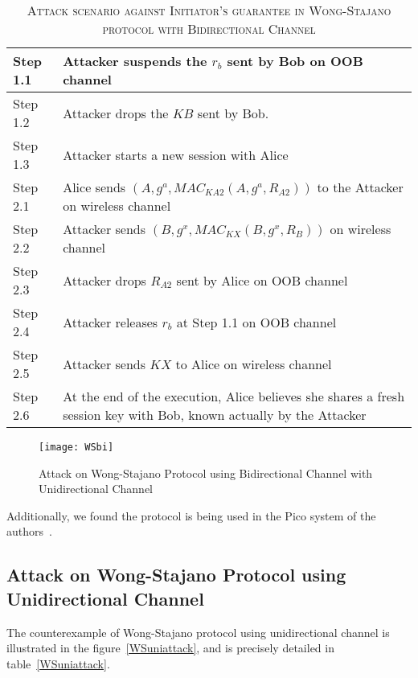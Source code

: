 \begin{table}[t]
\centering
\caption{\textsc{Attack scenario against Initiator's guarantee in Wong-Stajano protocol with Bidirectional Channel}}
\label{WSbiattacktable}
{\small
\begin{tabular}{| l | p{11cm} |}
 \hline
 Step 1.1 & Attacker suspends the $r_b$ sent by Bob on OOB channel\\ \hline
 Step 1.2 & Attacker drops the $KB$ sent by Bob. \\ \hline
 Step 1.3 & Attacker starts a new session with Alice\\ \hline \hline
 Step 2.1 & Alice sends $(A, g^{a}, MAC_{KA2}(A,g^{a},R_{A2}))$ to the Attacker on wireless channel\\ \hline
 Step 2.2 & Attacker sends $(B, g^{x}, MAC_{KX}(B,g^{x},R_{B}))$ on wireless channel\\ \hline
 Step 2.3 & Attacker drops $R_{A2}$ sent by Alice on OOB channel\\ \hline
 Step 2.4 & Attacker releases $r_b$ at Step 1.1 on OOB channel \\ \hline
 Step 2.5 & Attacker sends $KX$ to Alice on wireless channel\\ \hline
 Step 2.6 & At the end of the execution, Alice believes she shares a fresh session key with Bob, known actually by the Attacker\\ \hline
\end{tabular}
}
\end{table}

\begin{figure}
  \centering
  \texttt{[image: WSbi]}
  \caption{Attack on Wong-Stajano Protocol using Bidirectional Channel with Unidirectional Channel}
  \label{WSbiattack}
\end{figure}

Additionally, we found the protocol is being used in the Pico system of the authors~\cite{Stajano:2014aa}. 
 
\subsection{Attack on Wong-Stajano Protocol using Unidirectional Channel}

The counterexample of Wong-Stajano protocol using unidirectional channel is illustrated in the figure~\ref{WSuniattack}, and is precisely detailed in table~\ref{WSuniattack}. 

